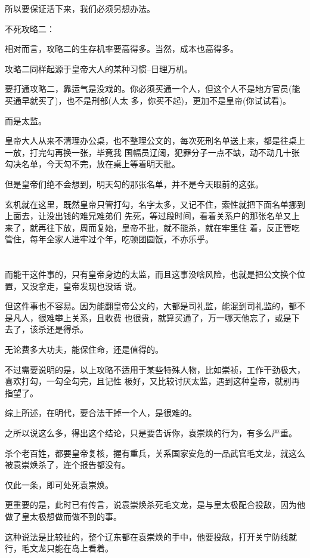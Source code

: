 \documentclass[11pt,a4paper,onecolumn]{article}
\begin{document}
所以要保证活下来，我们必须另想办法。

不死攻略二：

相对而言，攻略二的生存机率要高得多。当然，成本也高得多。

攻略二同样起源于皇帝大人的某种习惯--日理万机。

要打通攻略二，靠运气是没戏的。你必须买通一个人，但这个人不是地方官员(能买通早就买了)，也不是刑部(人太
多，你买不起)，更加不是皇帝(你试试看)。

而是太监。

皇帝大人从来不清理办公桌，也不整理公文的，每次死刑名单送上来，都是往桌上一放，打完勾再换一张，毕竟我
国幅员辽阔，犯罪分子一点不缺，动不动几十张勾决名单，今天勾不完，放在桌上等着明天批。

但是皇帝们绝不会想到，明天勾的那张名单，并不是今天眼前的这张。

玄机就在这里，既然皇帝只管打勾，名字太多，又记不住，索性就把下面名单挪到上面去，让没出钱的难兄难弟们
先死，等过段时间，看着关系户的那张名单又上来了，就再往下放，周而复始，皇帝不批，就不能杀，就在牢里住
着，反正管吃管住，每年全家人进牢过个年，吃顿团圆饭，不亦乐乎。

\section[\thesection]{}

而能干这件事的，只有皇帝身边的太监，而且这事没啥风险，也就是把公文换个位置，又没拿走，皇帝发现也没话
说。

但这件事也不容易。因为能翻皇帝公文的，大都是司礼监，能混到司礼监的，都不是凡人，很难攀上关系，且收费
也很贵，就算买通了，万一哪天他忘了，或是下去了，该杀还是得杀。

无论费多大功夫，能保住命，还是值得的。

不过需要说明的是，以上攻略不适用于某些特殊人物，比如崇祯，工作干劲极大，喜欢打勾，一勾全勾完，且记性
极好，又比较讨厌太监，遇到这种皇帝，就别再指望了。

综上所述，在明代，要合法干掉一个人，是很难的。

之所以说这么多，得出这个结论，只是要告诉你，袁崇焕的行为，有多么严重。

杀个老百姓，都要皇帝复核，握有重兵，关系国家安危的一品武官毛文龙，就这么被袁崇焕杀了，连个报告都没有。

仅此一条，即可处死袁崇焕。

更重要的是，此时已有传言，说袁崇焕杀死毛文龙，是与皇太极配合投敌，因为他做了皇太极想做而做不到的事。

这种说法是比较扯的，整个辽东都在袁崇焕的手中，他要投敌，打开关宁防线就行，毛文龙只能在岛上看着。
\end{document}
